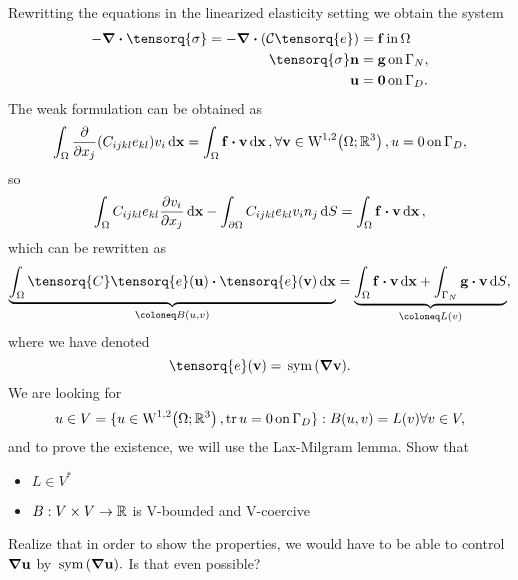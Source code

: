 \documentclass[11pt]{scrartcl} %
\begin{document}
Rewritting the equations in the linearized elasticity setting we obtain the system
\begin{align*}
	-\divergence{\tensorq{\sigma}} = - \divergence{\qty(\mathcal{C}\tensorq{e})} &= \vb{f} \, \text{in} \, \Omega \\
	\tensorq{\sigma}\vb{n} &= \vb{g} \, \text{on} \, \Gamma_{N}, \\
	\vb{u} &= \vb{0} \, \text{on} \, \Gamma_{D}.
\end{align*}
The weak formulation can be obtained as
\[
	\int_{\Omega} \pdv{x_j}\qty(C_{ijkl}e_{kl})v_i \dd{\vb{x}} = \int_{\Omega}\vb{f}\vdot \vb{v}\dd{\vb{x}}, \forall \vb{v} \in \WkpSet[1][2]{\Omega;\R^3}, u=0 \, \text{on} \, \Gamma_D,
\]
so
\[
	\int_{\Omega}C_{ijkl}e_{kl} \pdv{v_i}{x_j}\dd{\vb{x}}-\int_{\partial \Omega}C_{ijkl}e_{kl}v_i n_j \dd{S} = \int_{\Omega}\vb{f}\vdot \vb{v}\dd{\vb{x}},
\]
which can be rewritten as
\[
	\underbrace{\int_{\Omega}\tensorq{C}\tensorq{e}\qty(\vb{u}) \vdot \tensorq{e}\qty(\vb{v})\dd{\vb{x}}}_{\coloneq B\qty(u,v)} = \underbrace{\int_{\Omega}\vb{f} \vdot \vb{v}\dd{\vb{x}} + \int_{\Gamma_N}\vb{g}\vdot \vb{v}\dd{S}}_{\coloneq L(v)},
\]
where we have denoted
\[
	\tensorq{e}\qty(\vb{v}) = \, \text{sym} \,\qty(\grad \vb{v}).
\]
We are looking for
\[
	u \in V = \{ u \in \WkpSet[1][2]{\Omega; \R^3}, \tr u = 0 \, \text{on} \,\Gamma_D\}: B\qty(u,v) = L(v) \forall v \in V,
\]
and to prove the existence, we will use the Lax-Milgram lemma. Show that
\begin{itemize}
	\item $L \in V^{*}$
	\item $B:V \times V \to {\mathbb R}$ is V-bounded and V-coercive
\end{itemize}
Realize that in order to show the properties, we would have to be able to control $\grad \vb{u}$ by $\, \text{sym} \,\qty(\grad \vb{u}).$ Is that even possible?
\end{document}
